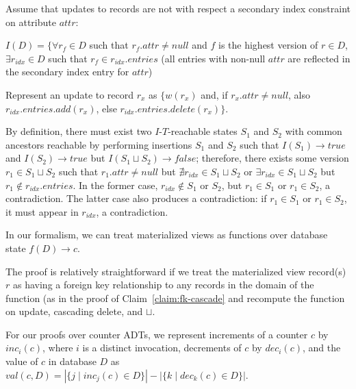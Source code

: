 \begin{claim} \label{claim:indexing}
  Assume that updates to records are not \iconfluent with respect a secondary index constraint on attribute $attr$:\vspace{.5em}

\noindent $I(D) = \{\forall r_f \in D$ such that $r_f.attr \neq null$ and $f$ is the highest version of $r\in D$, $\exists r_{idx} \in D$ such that $r_f \in r_{idx}.entries$ (all entries with non-null $attr$ are reflected in the secondary index entry for $attr$)\vspace{.5em}

  Represent an update to record $r_x$ as $\{w(r_x)$ and, if $r_x.attr \neq null$, also $r_{idx}.entries.add(r_x)$, else $r_{idx}.entries.delete(r_x)\}$.\vspace{.5em}

  By definition, there must exist two $I$-$T$-reachable states $S_1$ and $S_2$ with common ancestors reachable by performing insertions $S_1$ and $S_2$ such that $I(S_1) \rightarrow true$ and $I(S_2) \rightarrow true$ but $I(S_1 \sqcup S_2) \rightarrow false$; therefore, there exists some version $r_1 \in S_1 \sqcup S_2$ such that $r_1.attr \neq null$ but $\nexists r_{idx} \in S_1 \sqcup S_2$ or $\exists r_{idx} \in S_1 \sqcup S_2$ but $r_1 \notin r_{idx}.entries$. In the former case, $r_{idx} \notin S_1$ or $S_2$, but $r_1 \in S_1$ or $r_1 \in S_2$, a contradiction. The latter case also produces a contradiction: if $r_1 \in S_1$ or $r_1 \in S_2$, it must appear in $r_{idx}$, a contradiction.  \end{claim}

In our formalism, we can treat materialized views as functions over database state $f(D) \rightarrow c$.

\begin{claim} The proof is relatively straightforward if we treat the materialized view record(s) $r$ as having a foreign key relationship to any records in the domain of the function (as in the proof of Claim~\ref{claim:fk-cascade} and recompute the function on update, cascading delete, and $\sqcup$.\end{claim}

For our proofs over counter ADTs, we represent increments of a counter $c$ by $inc_i(c)$, where $i$ is a distinct invocation, decrements of $c$ by $dec_i(c)$, and the value of $c$ in database $D$ as $val(c, D) = |\{j \mid inc_j(c) \in D\}| - |\{k \mid dec_k(c) \in D\}|$.

